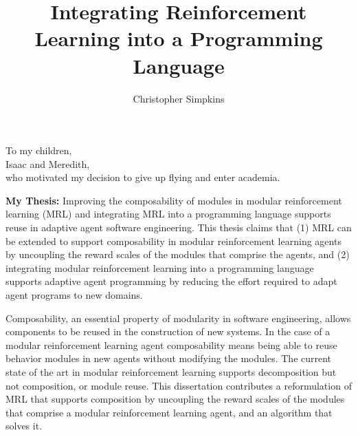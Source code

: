 \documentclass[12pt]{gatech-thesis}
\title{Integrating Reinforcement Learning into a Programming Language}
\author{Christopher Simpkins}
\begin{document}
\nocite{*}

\begin{preliminary}
\begin{dedication}
\null\vfil
{\large
\begin{center}
To my children,\\\vspace{12pt}
Isaac and Meredith,\\\vspace{12pt}
who motivated my decision to give up flying and enter academia.
\end{center}}
\vfil\null
\end{dedication}


\contents

\begin{summary}
\vspace{-1in}

{\bf My Thesis:} Improving the composability of modules in modular reinforcement learning (MRL) and integrating MRL into a programming language supports reuse in adaptive agent software engineering.  This thesis claims that (1) MRL can be extended to support composability in modular reinforcement learning agents by uncoupling the reward scales of the modules that comprise the agents, and (2) integrating modular reinforcement learning into a programming language supports adaptive agent programming by reducing the effort required to adapt agent programs to new domains.

Composability, an essential property of modularity in software engineering, allows components to be reused in the construction of new systems.  In the case of a modular reinforcement learning agent composability means being able to reuse behavior modules in new agents without modifying the modules.  The current state of the art in modular reinforcement learning supports decomposition but not composition, or module reuse.  This dissertation contributes a reformulation of MRL that supports composition by uncoupling the reward scales of the modules that comprise a modular reinforcement learning agent, and an algorithm that solves it.


\end{summary}
\end{preliminary}
\end{document}
